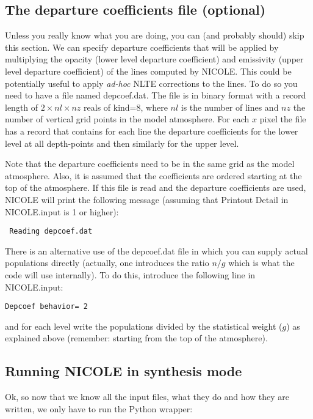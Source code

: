 \subsection{The departure coefficients file (optional)}
\label{depcoef}

Unless you really know what you are doing, you can (and probably
should) skip this section.  We can specify departure coefficients that
will be applied by multiplying the opacity (lower level departure
coefficient) and emissivity (upper level departure coefficient) of the
lines computed by NICOLE. This could be potentially useful to apply
{\em ad-hoc} NLTE corrections to the lines. To do so you need to have
a file named depcoef.dat. The file is in binary format with a record
length of $2\times nl \times nz$ reals of kind=8, where $nl$ is the
number of lines and $nz$ the number of vertical grid points in the
model atmosphere. For each $x$ pixel the file has a record
that contains for each line the departure coefficients for the lower
level at all depth-points and then similarly for the upper level. 

Note that the departure coefficients need to be in the same grid as
the model atmosphere. Also, it is assumed that the coefficients are
ordered starting at the top of the atmosphere. If this file is read
and the departure coefficients are used, NICOLE will print the
following message (assuming that Printout Detail in NICOLE.input is 1
or higher):
\begin{verbatim}
 Reading depcoef.dat
\end{verbatim}

There is an alternative use of the depcoef.dat file in which you can
supply actual populations directly (actually, one introduces the ratio
$n/g$ which is what the code will use internally). To do this, introduce 
the following line in NICOLE.input:
\begin{verbatim}
Depcoef behavior= 2
\end{verbatim}
and for each level write the populations divided by the statistical weight
($g$) as explained above (remember: starting from the top of the atmosphere).

\subsection{Running NICOLE in synthesis mode}
\label{sec:runsyn}

Ok, so now that we know all the input files, what they do and how they 
are written, we only have to run the Python wrapper:

